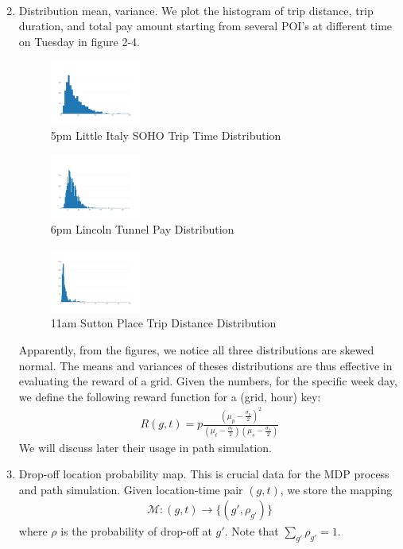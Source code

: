 \documentclass[letterpaper, 10 pt, conference]{ieeeconf}
\begin{document}
\begin{enumerate}
\begin{align}
\end{align}
\item Distribution mean, variance. We plot the histogram of trip distance, trip duration, and total pay amount starting from several POI's at different time on Tuesday in figure 2-4.
\begin{figure}
\caption{5pm Little Italy SOHO Trip Time Distribution}
\centering
\includegraphics[width=0.28\textwidth]{5pm-littleitaly-soho-triptime.jpeg}
\end{figure}
\begin{figure}
\caption{6pm Lincoln Tunnel Pay Distribution}
\centering
\includegraphics[width=0.28\textwidth]{18-lincoln-tunnel-pay.jpeg}
\end{figure}
\begin{figure}
\caption{11am Sutton Place Trip Distance Distribution}
\centering
\includegraphics[width=0.28\textwidth]{11am-sutton-place-dist.jpeg}
\end{figure}
Apparently, from the figures, we notice all three distributions are skewed normal. The means and variances of theses distributions are thus effective in evaluating the reward of a grid. Given the numbers, for the specific week day, we define the following reward function for a (grid, hour) key:
\begin{align}
R(g, t) = p\frac{(\mu_p-\frac{\sigma_p}{2})^2}{(\mu_t-\frac{\sigma_t}{2})(\mu_s-\frac{\sigma_s}{2})}
\end{align}
We will discuss later their usage in path simulation. 
\item Drop-off location probability map. This is crucial data for the MDP process and path simulation. Given location-time pair $(g, t)$, we store the mapping 
\begin{align}
\mathcal{M}:(g,t)\to \{(g', \rho_{g'})\}
\end{align}
where $\rho$ is the probability of drop-off at $g'$. Note that $\sum_{g'}\rho_{g'}=1$.
\end{enumerate}
\end{document}
